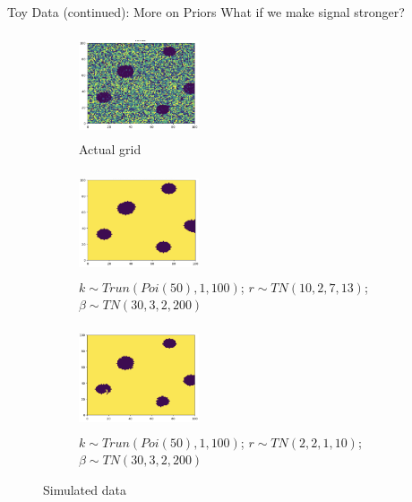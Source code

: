 \documentclass[10pt,mathserif]{beamer}
\begin{document}
\begin{frame}{Toy Data (continued): More on Priors}
What if we make signal stronger?
\begin{figure}[t!]
    \centering
    \begin{subfigure}[t]{0.3\textwidth}
        \centering
        \includegraphics[height=1.2in, width=1.4in]{../BDC_gridactual}
        \caption{Actual grid}
    \end{subfigure}%
    \begin{subfigure}[t]{0.3\textwidth}
        \centering
        \includegraphics[height=1.2in, width=1.4in]{../BDC_grid4_bigradius_ss}
        \caption{ $k \sim Trun(Poi(50), 1, 100)$; $r \sim TN(10, 2, 7, 13)$; $\beta \sim TN(30, 3, 2, 200)$}
    \end{subfigure}%
        \begin{subfigure}[t]{0.3\textwidth}
        \centering
        \includegraphics[height=1.2in, width=1.4in]{../BDC_grid5_smallradius_ss}
        \caption{ $k \sim Trun(Poi(50), 1, 100)$; $r \sim TN(2, 2, 1, 10)$; $\beta \sim TN(30, 3, 2, 200)$}
    \end{subfigure}
    \caption{Simulated data}
\end{figure}
\end{frame}
\end{document}
